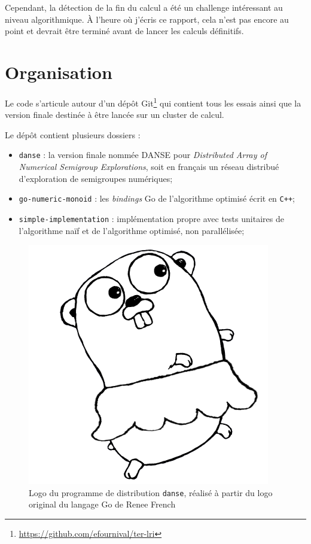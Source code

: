 \documentclass[12pt,a4paper]{report}
\begin{document}
Cependant, la détection de la fin du calcul a été un challenge intéressant au niveau algorithmique. À l'heure où j'écris ce rapport, cela n'est pas encore au point et devrait être terminé avant de lancer les calculs définitifs.

\section{Organisation}
Le code s'articule autour d'un dépôt Git\footnote{\url{https://github.com/efournival/ter-lri}} qui contient tous les essais ainsi que la version finale destinée à être lancée sur un cluster de calcul.

Le dépôt contient plusieurs dossiers :
\begin{itemize}
	\item	\texttt{danse} : la version finale nommée DANSE pour \emph{Distributed Array of Numerical Semigroup Explorations}, soit en français un réseau distribué d'exploration de semigroupes numériques;
	\item	\texttt{go-numeric-monoid} : les \emph{bindings} Go de l'algorithme optimisé écrit en \texttt{C++};
	\item	\texttt{simple-implementation} : implémentation propre avec tests unitaires de l'algorithme naïf et de l'algorithme optimisé, non parallélisée;
\end{itemize}

\begin{figure}[h]
	\centering
	\includegraphics[scale=0.35]{danse.png}
	\caption{Logo du programme de distribution \texttt{danse}, réalisé à partir du logo original du langage Go de Renee French}
\end{figure}
\end{document}
